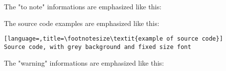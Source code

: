 \noindent The "to note" informations are emphasized like this:\\


\bigskip
\bigskip

\noindent The source code examples are emphasized like this:
\begin{lstlisting}[language=,title=\footnotesize\textit{example of source code}]
Source code, with grey background and fixed size font
\end{lstlisting}


\bigskip
\bigskip

\noindent The "warning" informations are emphasized like this:\\

